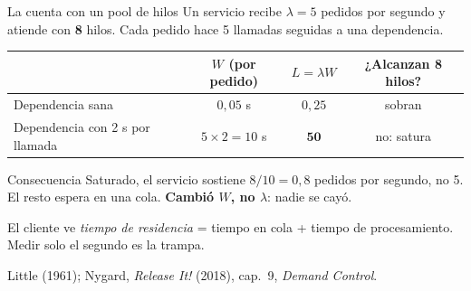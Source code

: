 \documentclass[institutional,screen,none]{ua-engineering-v6-beamer}
\begin{document}
\begin{frame}{La cuenta con un pool de hilos}
Un servicio recibe $\lambda = 5$ pedidos por segundo y atiende con \textbf{8} hilos. Cada pedido hace 5 llamadas seguidas a una dependencia.

\begin{center}
\begin{tabular}{lccc}
\toprule
 & $W$ (por pedido) & $L = \lambda W$ & ¿Alcanzan 8 hilos? \\
\midrule
Dependencia sana & $0{,}05$ s & $0{,}25$ & sobran \\
Dependencia con 2 s por llamada & $5 \times 2 = 10$ s & $\mathbf{50}$ & no: satura \\
\bottomrule
\end{tabular}
\end{center}

\begin{alertblock}{Consecuencia}
Saturado, el servicio sostiene $8/10 = 0{,}8$ pedidos por segundo, no 5. El resto espera en una cola. \textbf{Cambió $W$, no $\lambda$}: nadie se cayó.
\end{alertblock}

{\small El cliente ve \emph{tiempo de residencia} = tiempo en cola + tiempo de procesamiento. Medir solo el segundo es la trampa.}

{\scriptsize\color{UAIngMuted}Little (1961); Nygard, \emph{Release It!} (2018), cap.~9, \emph{Demand Control}.}
\end{frame}

\end{document}
